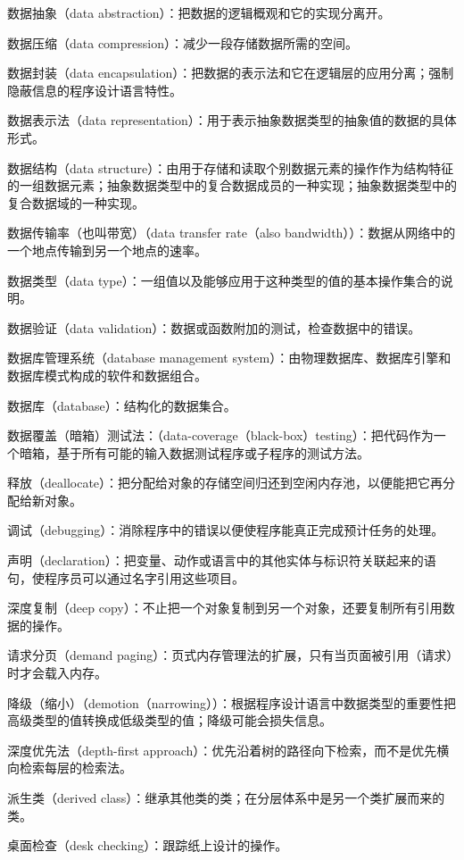数据抽象（data abstraction）：把数据的逻辑概观和它的实现分离开。

数据压缩（data compression）：减少一段存储数据所需的空间。

数据封装（data encapsulation）：把数据的表示法和它在逻辑层的应用分离；强制隐蔽信息的程序设计语言特性。

数据表示法（data representation）：用于表示抽象数据类型的抽象值的数据的具体形式。

数据结构（data structure）：由用于存储和读取个别数据元素的操作作为结构特征的一组数据元素；抽象数据类型中的复合数据成员的一种实现；抽象数据类型中的复合数据域的一种实现。

数据传输率（也叫带宽）（data transfer rate（also bandwidth））：数据从网络中的一个地点传输到另一个地点的速率。

数据类型（data type）：一组值以及能够应用于这种类型的值的基本操作集合的说明。

数据验证（data validation）：数据或函数附加的测试，检查数据中的错误。

数据库管理系统（database management system）：由物理数据库、数据库引擎和数据库模式构成的软件和数据组合。

数据库（database）：结构化的数据集合。

数据覆盖（暗箱）测试法：（data-coverage（black-box）testing）：把代码作为一个暗箱，基于所有可能的输入数据测试程序或子程序的测试方法。

释放（deallocate）：把分配给对象的存储空间归还到空闲内存池，以便能把它再分配给新对象。

调试（debugging）：消除程序中的错误以便使程序能真正完成预计任务的处理。

声明（declaration）：把变量、动作或语言中的其他实体与标识符关联起来的语句，使程序员可以通过名字引用这些项目。

深度复制（deep copy）：不止把一个对象复制到另一个对象，还要复制所有引用数据的操作。

请求分页（demand paging）：页式内存管理法的扩展，只有当页面被引用（请求）时才会载入内存。

降级（缩小）（demotion（narrowing））：根据程序设计语言中数据类型的重要性把高级类型的值转换成低级类型的值；降级可能会损失信息。

深度优先法（depth-first approach）：优先沿着树的路径向下检索，而不是优先横向检索每层的检索法。

派生类（derived class）：继承其他类的类；在分层体系中是另一个类扩展而来的类。

桌面检查（desk checking）：跟踪纸上设计的操作。

